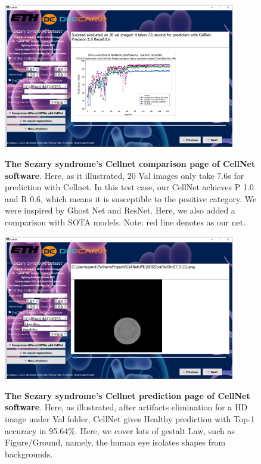 {\begin{figure}[t]
\begin{center}
\includegraphics[height=0.3\textheight,width=0.9\textwidth]{thesis-template-master/images/cellnet5-2page.PNG}
\label{fig:cellnet}
\end{center}
\caption{ \textbf{The Sezary syndrome's Cellnet comparison page of CellNet software}. Here, as it illustrated, 20 Val images only take 7.6s  for prediction with Cellnet. In this test case, our CellNet achieves P 1.0 and R 0.6, which means it is susceptible to the positive category. We were inspired by Ghost Net and ResNet. Here, we also added a comparison with SOTA models. Note: red line denotes as our net. }
\end{figure}

\begin{figure}[t]
\begin{center}
\includegraphics[height=0.3\textheight,width=0.9\textwidth]{thesis-template-master/images/cellnet5-3page.PNG}
\label{fig:cellnet}
\end{center}
\caption{ \textbf{The Sezary syndrome's Cellnet prediction page of CellNet software}. Here, as illustrated, after artifacts elimination for a HD image under Val folder, CellNet gives Healthy prediction with Top-1 accuracy in 95.64\%. Here, we cover lots of gestalt Law, such as Figure/Ground, namely, the human eye isolates shapes from backgrounds.}
\end{figure}


}
